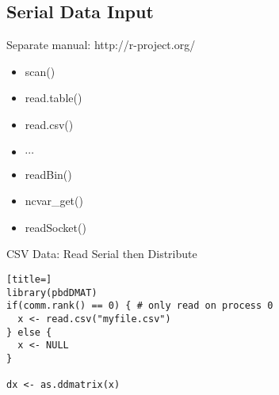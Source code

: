 \subsection{Serial Data Input}

\begin{frame}
\begin{block}{Separate manual: http://r-project.org/}
\begin{itemize}
\item scan()
\item read.table()
\item read.csv()
\item $\cdots$
\item readBin()
\item ncvar\_get()
\item readSocket()
\end{itemize}
\end{block}
\end{frame}

\begin{frame}
  \begin{exampleblock}{CSV Data: Read Serial then Distribute}\pause
\begin{lstlisting}[title=]
library(pbdDMAT)
if(comm.rank() == 0) { # only read on process 0
  x <- read.csv("myfile.csv")
} else {
  x <- NULL
}

dx <- as.ddmatrix(x)
\end{lstlisting}
  \end{exampleblock}
\end{frame}


